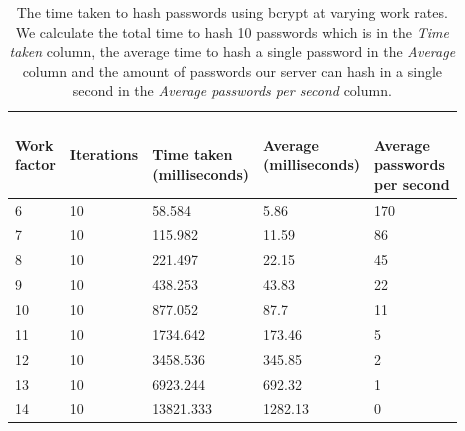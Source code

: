 \documentclass[12pt, titlepage]{article}
\begin{document}
\begin{table}[h]
	\begin{center}
    	\begin{tabular}{ | l | l | l | l | l | }
    \hline
    \shortstack{\textbf{Work} \\ \textbf{factor}} & \textbf{Iterations} & \shortstack{\\ \textbf{Time taken} \\ \textbf{(milliseconds)}} & \shortstack{\textbf{Average} \\ \textbf{(milliseconds)}} & \shortstack{ \\ \textbf{Average} \\ \textbf{passwords} \\ \textbf{per second}} \\
    \hline
    
    6 & 10 & 58.584 & 5.86 & 170 \\ \hline
    7 & 10 & 115.982 & 11.59 & 86 \\ \hline
    8 & 10 & 221.497 & 22.15 & 45 \\ \hline
    9 & 10 & 438.253 & 43.83 & 22 \\ \hline
    10 & 10 & 877.052 & 87.7 & 11 \\ \hline
    11 & 10 & 1734.642 & 173.46 & 5 \\ \hline
    12 & 10 & 3458.536 & 345.85 & 2 \\ \hline
    13 & 10 & 6923.244 & 692.32 & 1 \\ \hline
    14 & 10 & 13821.333 & 1282.13 & 0 \\ \hline
    \end{tabular}
    \caption{The time taken to hash passwords using bcrypt at varying work rates. We calculate the total time to hash 10 passwords which is in the \textit{Time taken} column, the average time to hash a single password in the \textit{Average} column and the amount of passwords our server can hash in a single second in the \textit{Average passwords per second} column.}
    \label{tab:bcryptWorkrates}
   \end{center}
\end{table}
\end{document}
